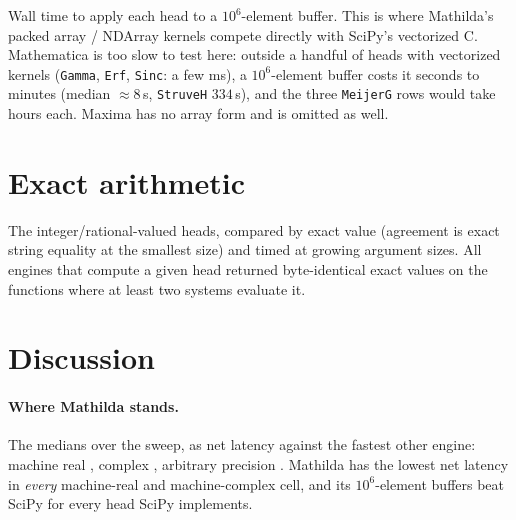\documentclass[11pt]{article}
\newcommand{\mcode}[1]{\texttt{\textcolor{mCode}{#1}}}
\begin{document}
Wall time to apply each head to a $10^6$-element buffer. This is where Mathilda's packed
array / NDArray kernels compete directly with SciPy's vectorized C. Mathematica is too
slow to test here: outside a handful of heads with vectorized kernels (\mcode{Gamma},
\mcode{Erf}, \mcode{Sinc}: a few ms), a $10^6$-element buffer costs it seconds to minutes
(median $\approx 8$\,s, \mcode{StruveH} $334$\,s), and the three \mcode{MeijerG} rows would
take hours each. Maxima has no array form and is omitted as well.



\section{Exact arithmetic}

The integer/rational-valued heads, compared by exact value (agreement is exact string
equality at the smallest size) and timed at growing argument sizes. All engines that
compute a given head returned byte-identical exact values on the \sfexactok{} functions
where at least two systems evaluate it.



\section{Discussion}

\paragraph{Where Mathilda stands.} The medians over the sweep, as net latency against the
fastest other engine: machine real \sfspeedMR{}, complex \sfspeedC{}, arbitrary precision
\sfspeedAP{}. Mathilda has the lowest net latency in \emph{every} machine-real and
machine-complex cell, and its $10^6$-element buffers beat SciPy for every head SciPy
implements.
\end{document}

